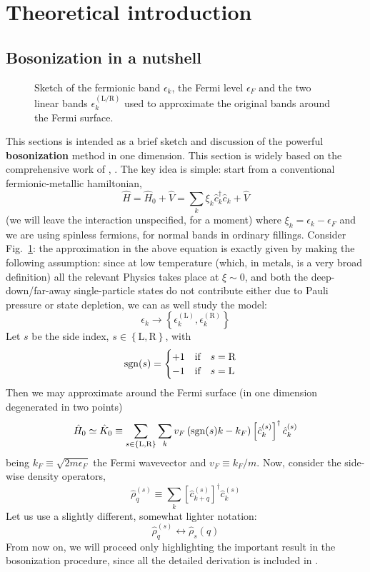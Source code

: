 \section{Theoretical introduction}

\todo

\subsection{Bosonization in a nutshell}

\begin{figure}
	\centering
	
	\caption{Sketch of the fermionic band $\epsilon_k$, the Fermi level $\epsilon_F$ and the two linear bands $\epsilon_k^{(\mathrm{L}/\mathrm{R})}$ used to approximate the original bands around the Fermi surface.}
	\label{fig:bands}
\end{figure}

This sections is intended as a brief sketch and discussion of the powerful \textbf{bosonization} method in one dimension. This section is widely based on the comprehensive work of \citeauthor{giamarchi2003quantum}, \cite{giamarchi2003quantum}. The key idea is simple: start from a conventional fermionic-metallic hamiltonian,
\[
	\hat H = \hat H_0 + \hat V = \sum_k \xi_k \hat c_k^\dagger \hat c_k + \hat V
\]
(we will leave the interaction unspecified, for a moment) where $\xi_k = \epsilon_k - \epsilon_F$ and we are using spinless fermions, for normal bands in ordinary fillings.
Consider Fig.~\ref{fig:bands}: the approximation in the above equation is exactly given by making the following assumption: since at low temperature (which, in metals, is a very broad definition) all the relevant Physics takes place at $\xi \sim 0$, and both the deep-down/far-away single-particle states do not contribute either due to Pauli pressure or state depletion, we can as well study the model:
\[
	\epsilon_k \to \left\{\epsilon_k^{(\mathrm L)}, \epsilon_k^{(\mathrm R)} \right\}
\]
Let $s$ be the side index, $s \in \left\{\mathrm L, \mathrm R\right\}$, with
\[
\mathrm{sgn}(s) = \begin{cases}
	+1 \quad \text{if} \quad s = \mathrm R \\
	-1 \quad \text{if} \quad s = \mathrm L
\end{cases}
\]
Then we may approximate around the Fermi surface (in one dimension degenerated in two points)
\[
	\hat H_0 \simeq \hat K_0 \equiv \sum_{s \in \left\{\mathrm L, \mathrm R\right\}} \sum_k v_F \left( \mathrm{sgn}(s) k -  k_F \right) \left[ \hat c_k^{(s)} \right]^\dagger \hat c_k^{(s)}
\]
being $k_F \equiv \sqrt{2m\epsilon_F}$ the Fermi wavevector and $v_F \equiv k_F / m$. Now, consider the side-wise density operators,
\[
	\hat \rho_q^{(s)} \equiv \sum_k  \left[ \hat c_{k+q}^{(s)} \right]^\dagger \hat c_k^{(s)}
\]
Let us use a slightly different, somewhat lighter notation:
\[
	\hat \rho_q^{(s)} \leftrightarrow \hat \rho_s (q)
\]
From now on, we will proceed only highlighting the important result in the bosonization procedure, since all the detailed derivation is included in \cite{giamarchi2003quantum}.

